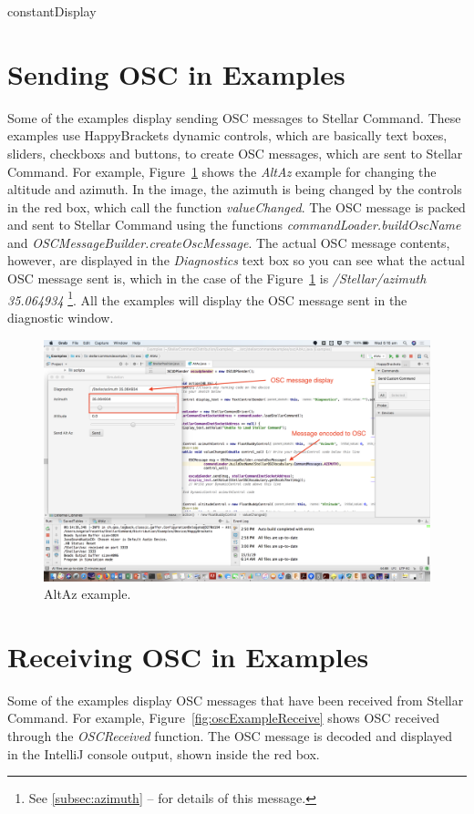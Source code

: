 constantDisplay

\section{Sending OSC in Examples}
Some of the examples display sending OSC messages to Stellar Command. 
These examples use HappyBrackets dynamic controls, which are basically text boxes, sliders, checkboxs and buttons, to create OSC messages, which are sent to Stellar Command. For example, Figure~\ref{fig:exampleAzimuth} shows the \textit{AltAz} example for changing the altitude and azimuth. In the image, the azimuth is being changed by the controls in the red box, which call the function \textit{valueChanged}. The OSC message is packed and sent to Stellar Command using the functions \textit{commandLoader.buildOscName} and  \textit{OSCMessageBuilder.createOscMessage}.  The actual OSC message contents, however, are displayed in the \textit{Diagnostics} text box so you can see what the actual OSC message sent is, which in the case of the Figure~\ref{fig:exampleAzimuth} is \textit{/Stellar/azimuth 35.064934}
 \footnote{See \ref{subsec:azimuth} --
 	\emph{} for details of this message.}.
 All the examples will display the OSC message sent in the diagnostic window.  

\begin{figure}[htbp]
	\centering
	\includegraphics[width=1\columnwidth]{exampleAzimuth}
	\caption{AltAz example.}
	\label{fig:exampleAzimuth}
\end{figure}


\section{Receiving OSC in Examples}\label{sec:oscreceiveexample}
Some of the examples display OSC messages that have been received from Stellar Command. For example, Figure~\ref{fig:oscExampleReceive} shows  OSC received through the \textit{OSCReceived} function. The OSC message is decoded and displayed in the IntelliJ console output, shown inside the red box. 

